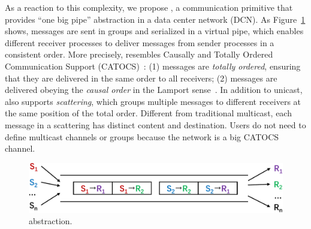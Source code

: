 



As a reaction to this complexity, we propose \sys{}, a communication primitive that provides ``one big pipe'' abstraction in a data center network (DCN). As Figure~\ref{fig:1pipe} shows, messages are sent in groups and serialized in a virtual pipe, which enables different receiver processes to deliver messages from sender processes in a consistent order.
More precisely, \sys{} resembles Causally and Totally Ordered Communication Support (CATOCS)~\cite{cheriton1994understanding}: (1) messages are \emph{totally ordered}, ensuring that they are delivered in the same order to all receivers; (2) messages are delivered obeying the \emph{causal order} in the Lamport  sense~\cite{lamport1978time}. In addition to unicast, \sys{} also supports \emph{scattering}, which groups multiple messages to different receivers at the same position of the total order. Different from traditional multicast, each message in a scattering has distinct content and destination. Users do not need to define multicast channels or groups because the network is a big CATOCS channel.


\begin{figure}[t]
	\centering
	\includegraphics[width=.45\textwidth]{images/1pipe.pdf}
	\caption{\sys{} abstraction.}
	\label{fig:1pipe}
\end{figure}


